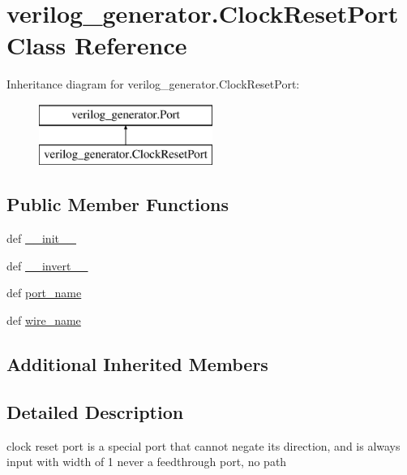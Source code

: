 \hypertarget{classverilog__generator_1_1ClockResetPort}{\section{verilog\-\_\-generator.\-Clock\-Reset\-Port Class Reference}
\label{classverilog__generator_1_1ClockResetPort}
}
Inheritance diagram for verilog\-\_\-generator.\-Clock\-Reset\-Port\-:\begin{figure}[H]
\begin{center}
\leavevmode
\includegraphics[height=2.000000cm]{classverilog__generator_1_1ClockResetPort}
\end{center}
\end{figure}
\subsection*{Public Member Functions}
\begin{DoxyCompactItemize}
\item 
def \hyperlink{classverilog__generator_1_1ClockResetPort_ad17226c115ee1037bebf401898c8f4b8}{\-\_\-\-\_\-init\-\_\-\-\_\-}
\item 
def \hyperlink{classverilog__generator_1_1ClockResetPort_a9d0fdc46490486651eeb7ee5fb3329a1}{\-\_\-\-\_\-invert\-\_\-\-\_\-}
\item 
def \hyperlink{classverilog__generator_1_1ClockResetPort_a3d1d318dec4561a26841184f897d08b3}{port\-\_\-name}
\item 
def \hyperlink{classverilog__generator_1_1ClockResetPort_a3a7abd08703934df6bec96f8e8690142}{wire\-\_\-name}
\end{DoxyCompactItemize}
\subsection*{Additional Inherited Members}


\subsection{Detailed Description}
\begin{DoxyVerb}clock reset port is a special port that cannot negate
its direction, and is always input with width of 1
never a feedthrough port, no path
\end{DoxyVerb}
 

